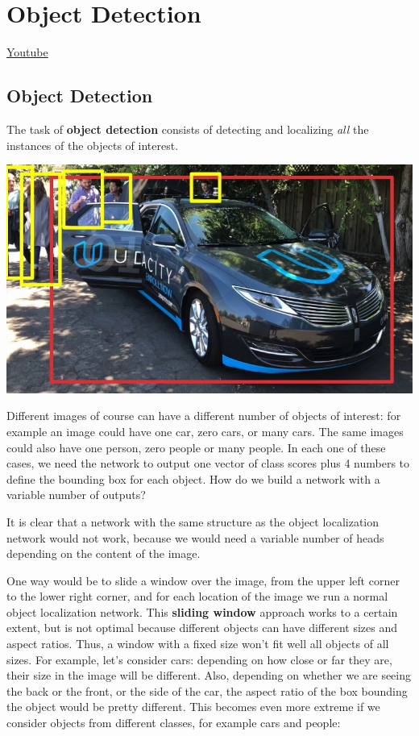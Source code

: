 \section{Object Detection}
\href{https://www.youtube.com/watch?v=XixevjP3gZQ&ab_channel=Udacity}{Youtube}

\subsection{Object Detection}

The task of \textbf{object detection} consists of detecting and localizing \textit{all} the instances of the objects of interest.

\includegraphics[width=0.5\linewidth]{img//cnn//depth/object-detection.jpeg}

Different images of course can have a different number of objects of interest: for example an image could have one car, zero cars, or many cars. The same images could also have one person, zero people or many people. In each one of these cases, we need the network to output one vector of class scores plus 4 numbers to define the bounding box for each object. How do we build a network with a variable number of outputs? \newline

It is clear that a network with the same structure as the object localization network would not work, because we would need a variable number of heads depending on the content of the image.\newline

One way would be to slide a window over the image, from the upper left corner to the lower right corner, and for each location of the image we run a normal object localization network. This \textbf{sliding window} approach works to a certain extent, but is not optimal because different objects can have different sizes and aspect ratios. Thus, a window with a fixed size won't fit well all objects of all sizes. For example, let's consider cars: depending on how close or far they are, their size in the image will be different. Also, depending on whether we are seeing the back or the front, or the side of the car, the aspect ratio of the box bounding the object would be pretty different. This becomes even more extreme if we consider objects from different classes, for example cars and people:

